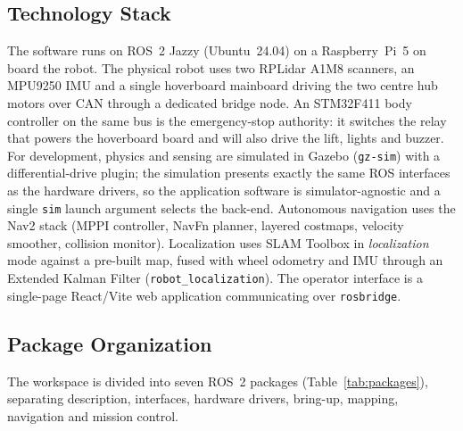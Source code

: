 \documentclass[11pt,a4paper]{article}
\newcommand{\code}[1]{\texttt{\small #1}}
\begin{document}
\subsection{Technology Stack}
The software runs on ROS~2 Jazzy (Ubuntu~24.04) on a Raspberry~Pi~5 on board
the robot. The physical robot uses two RPLidar A1M8 scanners, an MPU9250 IMU
and a single hoverboard mainboard driving the two centre hub motors over CAN
through a dedicated bridge node. An STM32F411 body controller on the same bus
is the emergency-stop authority: it switches the relay that powers the
hoverboard board and will also drive the lift, lights and buzzer. For
development, physics and sensing are simulated in Gazebo
(\code{gz-sim}) with a differential-drive plugin; the simulation presents exactly
the same ROS interfaces as the hardware drivers, so the application software
is simulator-agnostic and a single \code{sim} launch argument selects the
back-end. Autonomous
navigation uses the Nav2 stack (MPPI controller, NavFn planner, layered
costmaps, velocity smoother, collision monitor). Localization uses SLAM
Toolbox in \emph{localization} mode against a pre-built map, fused with
wheel odometry and IMU through an Extended Kalman Filter
(\code{robot\_localization}). The operator interface is a single-page
React/Vite web application communicating over \code{rosbridge}.

\subsection{Package Organization}
The workspace is divided into seven ROS~2 packages
(Table~\ref{tab:packages}), separating description, interfaces, hardware
drivers, bring-up, mapping, navigation and mission control.
\end{document}

